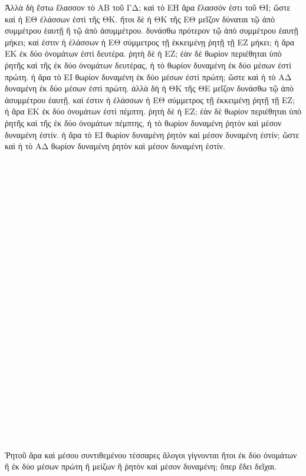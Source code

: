 \begin{Parallel}{}{}
{{\greekfont Ἀλλὰ δὴ ἔστω ἔλασσον τὸ ΑΒ τοῦ ΓΔ; καὶ τὸ ΕΗ ἄρα ἔλασσόν
ἐστι τοῦ ΘΙ; ὥστε καὶ ἡ ΕΘ ἐλάσσων ἐστὶ τῆς ΘΚ. ἤτοι δὲ ἡ ΘΚ
τῆς ΕΘ
 μεῖζον δύναται τῷ ἀπὸ συμμέτρου
ἑαυτῇ ἢ τῷ ἀπὸ ἀσυμμέτρου. δυνάσθω πρότερον τῷ ἀπὸ
συμμέτρου ἑαυτῇ μήκει; καί ἐστιν ἡ ἐλάσσων ἡ ΕΘ σύμμετρος
τῇ ἐκκειμένῃ ῥητῇ τῇ ΕΖ μήκει; ἡ ἄρα ΕΚ ἐκ δύο
ὀνομάτων ἐστὶ δευτέρα. ῥητὴ δὲ ἡ ΕΖ; ἐὰν δὲ θωρίον
περιέθηται ὑπὸ ῥητῆς καὶ τῆς ἐκ δύο ὀνομάτων δευτέρας,
ἡ τὸ θωρίον δυναμένη ἐκ δύο μέσων ἐστὶ πρώτη. ἡ ἄρα
τὸ ΕΙ θωρίον δυναμένη ἐκ δύο μέσων ἐστὶ πρώτη; ὥστε
καὶ ἡ τὸ ΑΔ δυναμένη ἐκ δύο μέσων ἐστὶ πρώτη. ἀλλὰ δὴ
ἡ ΘΚ τῆς ΘΕ μεῖζον δυνάσθω τῷ ἀπὸ ἀσυμμέτρου ἑαυτῇ.
καί ἐστιν ἡ ἐλάσσων ἡ ΕΘ σύμμετρος τῇ ἐκκειμένῃ
ῥητῇ τῇ ΕΖ; ἡ ἄρα ΕΚ ἐκ δύο ὀνομάτων ἐστὶ πέμπτη.
ῥητὴ δὲ ἡ ΕΖ; ἐὰν δὲ θωρίον περιέθηται ὑπὸ ῥητῆς καὶ τῆς
ἐκ δύο ὀνομάτων πέμπτης, ἡ τὸ θωρίον δυναμένη ῥητὸν καὶ μέσον δυναμένη ἐστίν. ἡ ἄρα τὸ ΕΙ θωρίον δυναμένη ῥητὸν
καὶ μέσον δυναμένη ἐστίν; ὥστε καὶ ἡ τὸ ΑΔ θωρίον δυναμένη
ῥητὸν καὶ μέσον δυναμένη ἐστίν.}\\~\\~\\~\\~\\~\\~\\~\\~\\~\\~\\~\\~\\~\\~\\~\\~\\~\\~\\~\\~\\~\\~\\~\\~\\~\\

\centerline{}

{\greekfont Ῥητοῦ ἄρα καὶ μέσου συντιθεμένου τέσσαρες ἄλογοι γίγνονται
ἤτοι ἐκ δύο ὀνομάτων ἢ ἐκ δύο μέσων πρώτη ἢ μείζων
ἢ ῥητὸν καὶ μέσον δυναμένη; ὅπερ ἔδει δεῖχαι.}}

\end{Parallel}
